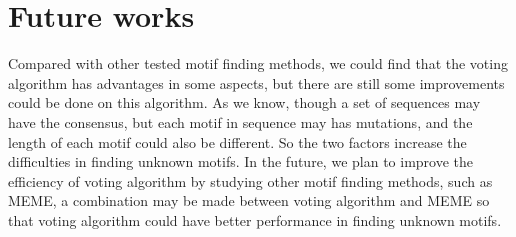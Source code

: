 \documentclass[11pt]{article}
\begin{document}
\section{Future works}
Compared with other tested motif finding methods, we could find that
the voting algorithm has advantages in some aspects, but there are
still some improvements could be done on this algorithm. As we know,
though a set of sequences may have the consensus, but each motif in
sequence may has mutations, and the length of each motif could also
be different. So the two factors increase the difficulties in
finding unknown motifs. In the future, we plan to improve the
efficiency of voting algorithm by studying other motif finding
methods, such as MEME, a combination may be made between voting
algorithm and MEME so that voting algorithm could have better
performance in finding unknown motifs.\\
\end{document}
